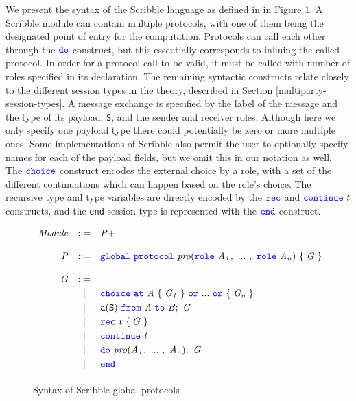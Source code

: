 \documentclass[12pt,twoside]{report}
\newcommand{\white}{\ \ \ \ \ \ \ \ \ \ \ \ }
\begin{document}
We present the syntax of the Scribble language as defined in \cite{featherweight} in Figure \ref{scribble-global-protocol}. A Scribble module can contain multiple protocols, with one of them being the designated point of entry for the computation. Protocols can call each other through the ${\color{blue}\mathtt{do}}$ construct, but this essentially corresponds to inlining the called protocol. In order for a protocol call to be valid, it must be called with number of roles specified in its declaration. The remaining syntactic constructs relate closely to the different session types in the theory, described in Section \ref{multiparty-session-types}. A message exchange is specified by the label of the message and the type of its payload, \texttt{S}, and the sender and receiver roles. Although here we only specify one payload type there could potentially be zero or more multiple ones. Some implementations of Scribble also permit the user to optionally specify names for each of the payload fields, but we omit this in our notation as well. The ${\color{blue}\mathtt{choice}}$ construct encodes the external choice by a role, with a set of the different continuations which can happen based on the role's choice. The recursive type and type variables are directly encoded by the ${\color{blue}\mathtt{rec}}$ and ${\color{blue}\mathtt{continue}}\ t$ constructs, and the \texttt{end} session type is represented with the ${\color{blue}\mathtt{end}}$ construct.\\



\begin{figure}[!h]
    \centering
    \begin{math}
        \begin{array}{rcl}
            \mathit{Module} & ::= & \mathit{P}+\\\\
            \mathit{P} & ::= & {\color{blue}\mathtt{global}}\ {\color{blue}\mathtt{protocol}}\ \mathit{pro}({\color{blue}\mathtt{role}}\ \mathit{A_1},\ ...\ ,\ {\color{blue}\mathtt{role}}\ \mathit{A_n})\ \{\;\mathit{G}\;\} \\\\
            \mathit{G} & ::= &\\[2.75pt]
              &   | & {\color{blue}\mathtt{choice}}\ {\color{blue}\mathtt{at}}\ \mathit{A}\ \{\;\mathit{G_1}\;\}\ {\color{blue}\mathtt{or}}\ ...\ {\color{blue}\mathtt{or}}\ \{\;\mathit{G_n}\;\} \\[2.75pt]
              &   | & \mathtt{a}(\mathtt{S})\ {\color{blue}\mathtt{from}}\ \mathit{A}\ {\color{blue}\mathtt{to}}\ \mathit{B};\ \mathit{G} \\[2.75pt]
              &   | & {\color{blue}\mathtt{rec}}\ \mathit{t}\ \{\;G\;\} \\[2.75pt]
              &   | &  {\color{blue}\mathtt{continue}}\ \mathit{t} \\[2.75pt]
              &   | & {\color{blue}\mathtt{do}}\ \mathit{pro}(\mathit{A_1},\ ...\ ,\ \mathit{A_n});\ \mathit{G} \\[2.75pt]
              &   | & {\color{blue}\mathtt{end}} \\[2.75pt]
        \end{array}
    \end{math}
    \caption{Syntax of Scribble global protocols}
    \label{scribble-global-protocol}
\end{figure}
\end{document}
